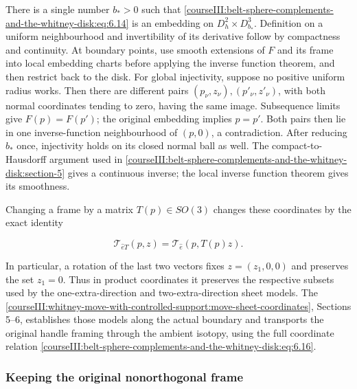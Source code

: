 There is a single number \(b_*>0\) such that \eqref{courseIII:belt-sphere-complements-and-the-whitney-disk:eq:6.14} is an embedding on \(D_h^2\times D_{b_*}^3\). Definition on a uniform neighbourhood and invertibility of its derivative follow by compactness and continuity. At boundary points, use smooth extensions of \(F\) and its frame into local embedding charts before applying the inverse function theorem, and then restrict back to the disk. For global injectivity, suppose no positive uniform radius works. Then there are different pairs \((p_\nu,z_\nu),(p'_\nu,z'_\nu)\), with both normal coordinates tending to zero, having the same image. Subsequence limits give \(F(p)=F(p')\); the original embedding implies \(p=p'\). Both pairs then lie in one inverse-function neighbourhood of \((p,0)\), a contradiction. After reducing \(b_*\) once, injectivity holds on its closed normal ball as well. The compact-to-Hausdorff argument used in \cref{courseIII:belt-sphere-complements-and-the-whitney-disk:section-5} gives a continuous inverse; the local inverse function theorem gives its smoothness.

Changing a frame by a matrix \(T(p)\in SO(3)\) changes these coordinates by the exact identity

\begin{equation}
\mathcal T_{\widehat eT}(p,z)
=\mathcal T_{\widehat e}(p,T(p)z).
\label{courseIII:belt-sphere-complements-and-the-whitney-disk:eq:6.16}
\end{equation}

In particular, a rotation of the last two vectors fixes \(z=(z_1,0,0)\) and preserves the set \(z_1=0\). Thus in product coordinates it preserves the respective subsets used by the one-extra-direction and two-extra-direction sheet models. The \cref{courseIII:whitney-move-with-controlled-support:move-sheet-coordinates}, Sections 5--6, establishes those models along the actual boundary and transports the original handle framing through the ambient isotopy, using the full coordinate relation \eqref{courseIII:belt-sphere-complements-and-the-whitney-disk:eq:6.16}.

\subsubsection{Keeping the original nonorthogonal frame}
\label{courseIII:belt-sphere-complements-and-the-whitney-disk:full-original-frame}

\label{courseIII:belt-sphere-complements-and-the-whitney-disk:section-6.6}

